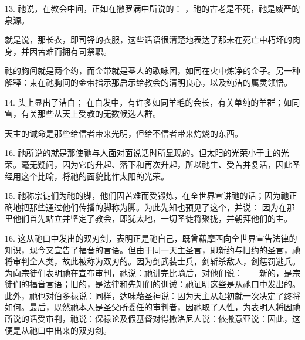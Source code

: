 13.  祂说，在教会中间，正如在撒罗满中所说的： ，祂的古老是不死，祂是威严的泉源。\par

 就是说，那长衣，即司铎的衣服，这些话语很清楚地表达了那未在死亡中朽坏的肉身，并因苦难而拥有司祭职。\par

 祂的胸间就是两个约，而金带就是圣人的歌咏团，如同在火中炼净的金子。另一种解释：束在祂胸间的金带指示那启示给教会的清明良心，以及纯洁的属灵领悟。\par

14.  头上显出了洁白；  在白发中，有许多如同羊毛的会长，有关单纯的羊群；如同雪，有关那些从天上受教的无数候选人群。\par

 天主的诫命是那些给信者带来光明，但给不信者带来灼烧的东西。\par

16.  祂所说的就是那使祂与人面对面说话时所显现的。但太阳的光荣小于主的光荣。毫无疑问，因为它的升起、落下和再次升起，所以祂生、受苦并复活，因此圣经用这个比喻，将祂的面貌比作太阳的光荣。\par

15.  祂称宗徒们为祂的脚，他们因苦难而受锻炼，在全世界宣讲祂的话；因为祂正确地把那些通过他们传播的脚称为脚。为此先知也预见了这个，并说： 因为在那里他们首先站立并坚定了教会，即犹太地，一切圣徒将聚拢，并朝拜他们的主。\par

16. 这从祂口中发出的双刃剑，表明正是祂自己，既曾藉摩西向全世界宣告法律的知识，现今又宣告了福音的言语。但由于同一天主圣言，即新约与旧约的圣言，祂将审判全人类，故此被称为双刃的。因为剑武装士兵，剑斩杀敌人，剑惩罚逃兵。为向宗徒们表明祂在宣布审判，祂说：祂讲完比喻后，对他们说：——新的，是宗徒们的福音言语；旧的，是法律和先知们的训诫：祂证明这些是从祂口中发出的。此外，祂也对伯多禄说：同样，达味藉圣神说：因为天主从起初就一次决定了终将如何。最后，既然祂本人是圣父所委任的审判者，因祂取了人性，为表明人将因祂所说的话受审判，祂说：保禄论及假基督对得撒洛尼人说：依撒意亚说：因此，这便是从祂口中出来的双刃剑。\par

